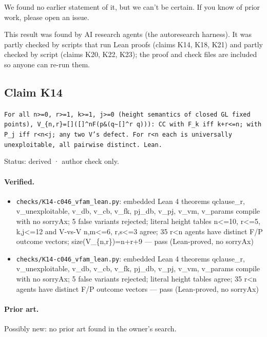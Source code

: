 \documentclass{article}
\begin{document}
We found no earlier statement of it, but we can't be certain. If you know of prior work, please open an issue.

This result was found by AI research agents (the autoresearch harness). It was partly checked by scripts that run Lean proofs (claims K14, K18, K21) and partly checked by script (claims K20, K22, K23); the proof and check files are included so anyone can re-run them.

\subsection*{Claim K14}

\texttt{For all n\textgreater{}=0, r\textgreater{}=1, k\textgreater{}=1, j\textgreater{}=0 (height semantics of closed GL fixed points), V\_\{n,r\}=[]([]\textasciicircum{}nF\textbar{}(p\&(q\textbar{}\textasciitilde{}[]\textasciicircum{}r q))): CC with F\_k iff k+r\textless{}=n; with P\_j iff r\textless{}n\textless{}j; any two V's defect. For r\textless{}n each is universally unexploitable, all pairwise distinct. Lean.}

Status: derived · author check only.

\paragraph{Verified.}
\begin{itemize}
\item \texttt{checks/K14-c046\_vfam\_lean.py}: embedded Lean 4 theorems qclause\_r, v\_unexploitable, v\_db, v\_cb, v\_fk, pj\_db, v\_pj, v\_vm, v\_params compile with no sorryAx; 5 false variants rejected; literal height tables n\textless{}=10, r\textless{}=5, k,j\textless{}=12 and V-vs-V n,m\textless{}=6, r,s\textless{}=3 agree; 35 r\textless{}n agents have distinct F/P outcome vectors; size(V\_\{n,r\})=n+r+9 --- pass (Lean-proved, no sorryAx)
\item \texttt{checks/K14-c046\_vfam\_lean.py}: embedded Lean 4 theorems qclause\_r, v\_unexploitable, v\_db, v\_cb, v\_fk, pj\_db, v\_pj, v\_vm, v\_params compile with no sorryAx; 5 false variants rejected; literal height tables agree; 35 r\textless{}n agents have distinct F/P outcome vectors --- pass (Lean-proved, no sorryAx)
\end{itemize}

\paragraph{Prior art.} Possibly new: no prior art found in the owner's search.
\end{document}
